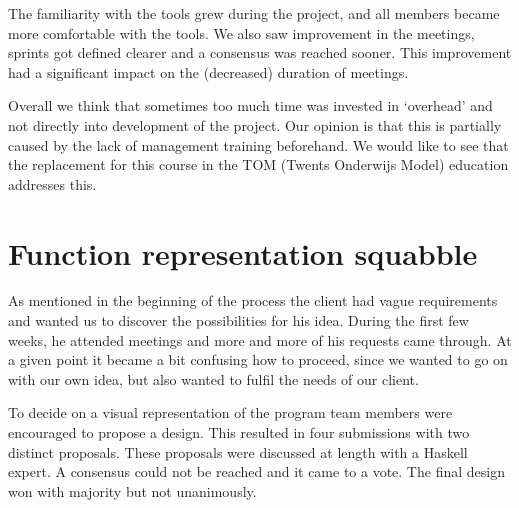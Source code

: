 The familiarity with the tools grew during the project, and all members became more comfortable with the tools. We also saw improvement in the meetings, sprints got defined clearer and a consensus was reached sooner. This improvement had a significant impact on the (decreased) duration of meetings.

Overall we think that sometimes too much time was invested in `overhead' and not directly into development of the project. Our opinion is that this is partially caused by the lack of management training beforehand. We would like to see that the replacement for this course in the TOM (Twents Onderwijs Model) education addresses this.

\section{Function representation squabble}

As mentioned in the beginning of the process the client had vague requirements and wanted us to discover the possibilities for his idea.
During the first few weeks, he attended meetings and more and more of his requests came through.  At a given point it became a bit confusing how to proceed, since we wanted to go on with our own idea, but also wanted to fulfil the needs of our client.

To decide on a visual representation of the program team members were encouraged to propose a design. This resulted in four submissions with two distinct proposals. These proposals were discussed at length with a Haskell expert. A consensus could not be reached and it came to a vote. The final design won with majority but not unanimously.
